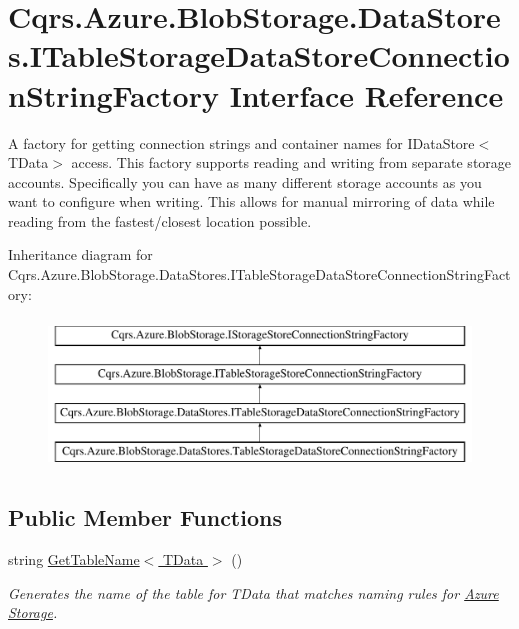 \hypertarget{interfaceCqrs_1_1Azure_1_1BlobStorage_1_1DataStores_1_1ITableStorageDataStoreConnectionStringFactory}{}\section{Cqrs.\+Azure.\+Blob\+Storage.\+Data\+Stores.\+I\+Table\+Storage\+Data\+Store\+Connection\+String\+Factory Interface Reference}
\label{interfaceCqrs_1_1Azure_1_1BlobStorage_1_1DataStores_1_1ITableStorageDataStoreConnectionStringFactory}


A factory for getting connection strings and container names for I\+Data\+Store$<$\+T\+Data$>$ access. This factory supports reading and writing from separate storage accounts. Specifically you can have as many different storage accounts as you want to configure when writing. This allows for manual mirroring of data while reading from the fastest/closest location possible.  


Inheritance diagram for Cqrs.\+Azure.\+Blob\+Storage.\+Data\+Stores.\+I\+Table\+Storage\+Data\+Store\+Connection\+String\+Factory\+:\begin{figure}[H]
\begin{center}
\leavevmode
\includegraphics[height=4.000000cm]{interfaceCqrs_1_1Azure_1_1BlobStorage_1_1DataStores_1_1ITableStorageDataStoreConnectionStringFactory}
\end{center}
\end{figure}
\subsection*{Public Member Functions}
\begin{DoxyCompactItemize}
\item 
string \hyperlink{interfaceCqrs_1_1Azure_1_1BlobStorage_1_1DataStores_1_1ITableStorageDataStoreConnectionStringFactory_a40ff0417d18d0cf9d0f59d6dfddfaa15_a40ff0417d18d0cf9d0f59d6dfddfaa15}{Get\+Table\+Name$<$ T\+Data $>$} ()
\begin{DoxyCompactList}\small\item\em Generates the name of the table for {\itshape T\+Data}  that matches naming rules for \hyperlink{namespaceCqrs_1_1Azure}{Azure} \hyperlink{namespaceCqrs_1_1Azure_1_1Storage}{Storage}. \end{DoxyCompactList}\end{DoxyCompactItemize}


